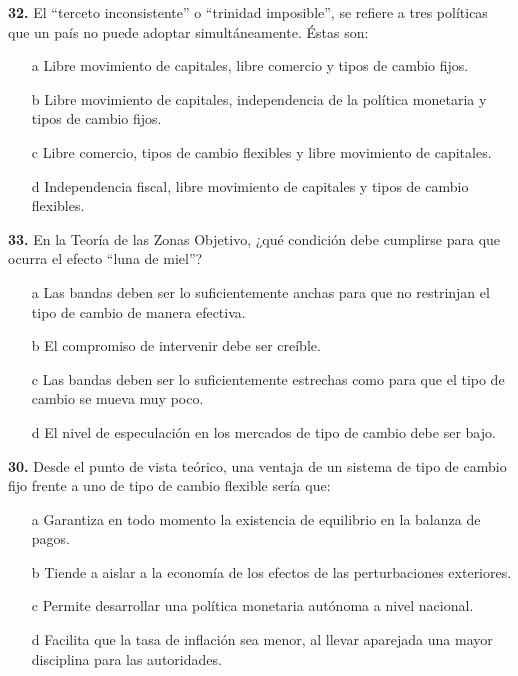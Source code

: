 \documentclass{nuevotema}
\begin{document}
\textbf{32.} El ``terceto inconsistente'' o ``trinidad imposible'', se refiere a tres políticas que un país no puede adoptar simultáneamente. Éstas son:

\begin{itemize}
	\item[a] Libre movimiento de capitales, libre comercio y tipos de cambio fijos.
	\item[b] Libre movimiento de capitales, independencia de la política monetaria y tipos de cambio fijos.
	\item[c] Libre comercio, tipos de cambio flexibles y libre movimiento de capitales.
	\item[d] Independencia fiscal, libre movimiento de capitales y tipos de cambio flexibles.
\end{itemize}

\textbf{33.} En la Teoría de las Zonas Objetivo, ¿qué condición debe cumplirse para que ocurra el efecto ``luna de miel''?

\begin{itemize}
	\item[a] Las bandas deben ser lo suficientemente anchas para que no restrinjan el tipo de cambio de manera efectiva.
	\item[b] El compromiso de intervenir debe ser creíble. 
	\item[c] Las bandas deben ser lo suficientemente estrechas como para que el tipo de cambio se mueva muy poco.
	\item[d] El nivel de especulación en los mercados de tipo de cambio debe ser bajo.
\end{itemize}

\textbf{30.} Desde el punto de vista teórico, una ventaja de un sistema de tipo de cambio fijo frente a uno de tipo de cambio flexible sería que:

\begin{itemize}
	\item[a] Garantiza en todo momento la existencia de equilibrio en la balanza de pagos.
	\item[b] Tiende a aislar a la economía de los efectos de las perturbaciones exteriores.
	\item[c] Permite desarrollar una política monetaria autónoma a nivel nacional.
	\item[d] Facilita que la tasa de inflación sea menor, al llevar aparejada una mayor disciplina para las autoridades.
\end{itemize}
\end{document}
